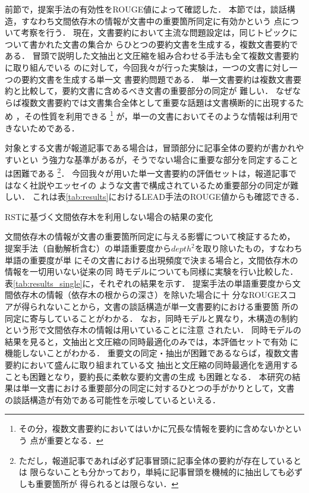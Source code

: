 \documentclass[japanese]{jnlp_1.4}
\begin{document}
前節で，提案手法の有効性をROUGE値によって確認した．
本節では，談話構造，すなわち文間依存木の情報が文書中の重要箇所同定に有効かという
点について考察を行う．
現在，文書要約において主流な問題設定は，同じトピックについて書かれた文書の集合か
らひとつの要約文書を生成する，複数文書要約である．
冒頭で説明した文抽出と文圧縮を組み合わせる手法も全て複数文書要約に取り組んでいる
のに対して，今回我々が行った実験は，一つの文書に対し一つの要約文書を生成する単一文
書要約問題である．
単一文書要約は複数文書要約と比較して，要約文書に含めるべき文書の重要部分の同定が
難しい．
なぜならば複数文書要約では文書集合全体として重要な話題は文書横断的に出現するため
，その性質を利用できる
\footnote{その分，複数文書要約においてはいかに冗長な情報を要約に含めないかという
点が重要となる．}
が，単一の文書においてそのような情報は利用できないためである．

対象とする文書が報道記事である場合は，冒頭部分に記事全体の要約が書かれやすいとい
う強力な基準があるが，そうでない場合に重要な部分を同定することは困難である
\footnote{ただし，報道記事であれば必ず記事冒頭に記事全体の要約が存在しているとは
限らないことも分かっており，単純に記事冒頭を機械的に抽出しても必ずしも重要箇所が
得られるとは限らない\cite{yang:14}．}．
今回我々が用いた単一文書要約の評価セットは，報道記事ではなく社説やエッセイの
ような文書で構成されているため重要部分の同定が難しい．
これは表\ref{tab:results}におけるLEAD手法のROUGE値からも確認できる．

\begin{table}[b]
\caption{ RSTに基づく文間依存木を利用しない場合の結果の変化}
\label{tab:results_single}

\end{table}

文間依存木の情報が文書の重要箇所同定に与える影響について検証するため，
提案手法（自動解析含む）の単語重要度から$depth^2$を取り除いたもの，すなわち単語の重要度が単
にその文書における出現頻度で決まる場合と，文間依存木の情報を一切用いない従来の同
時モデルについても同様に実験を行い比較した．
表\ref{tab:results_single}に，それぞれの結果を示す．
提案手法の単語重要度から文間依存木の情報（依存木の根からの深さ）を除いた場合に十
分なROUGEスコアが得られないことから，文書の談話構造が単一文書要約における重要箇
所の同定に寄与していることがわかる．
なお，同時モデルと異なり，木構造の制約という形で文間依存木の情報は用いていることに注意
されたい．
同時モデルの結果を見ると，文抽出と文圧縮の同時最適化のみでは，本評価セットで有効
に機能しないことがわかる．
重要文の同定・抽出が困難であるならば，複数文書要約において盛んに取り組まれている文
抽出と文圧縮の同時最適化を適用することも困難となり，要約長に柔軟な要約文書の生成
も困難となる．
本研究の結果は単一文書における重要部分の同定に対するひとつの手がかりとして，文書
の談話構造が有効である可能性を示唆しているといえる．
\end{document}
